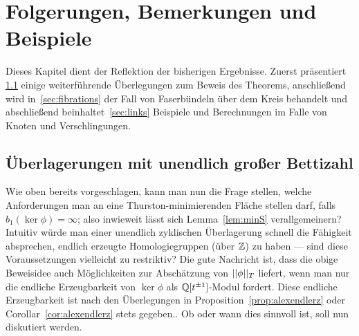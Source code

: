 
\section{Folgerungen, Bemerkungen und Beispiele}
    Dieses Kapitel dient der Reflektion der bisherigen Ergebnisse. Zuerst präsentiert \ref{verallggruppenring} einige weiterführende Überlegungen zum Beweis des Theorems, anschließend wird in~\ref{sec:fibrations} der Fall von Faserbündeln über dem Kreis behandelt und abschließend beinhaltet~\ref{sec:links} Beispiele und Berechnungen im Falle von Knoten und Verschlingungen.

    \subsection{Überlagerungen mit unendlich großer Bettizahl}
        
    \label{verallggruppenring}
    Wie oben bereits vorgeschlagen, kann man nun die Frage stellen, welche Anforderungen man an eine Thurston-minimierenden Fläche stellen darf, falls $b_1(\ker\phi)=\infty$; also inwieweit lässt sich Lemma~\ref{lem:minS} verallgemeinern? Intuitiv würde man einer unendlich zyklischen Überlagerung schnell die Fähigkeit absprechen, endlich erzeugte Homologiegruppen (über $\mathbb{Z}$) zu haben --- sind diese Voraussetzungen vielleicht zu restriktiv? Die gute Nachricht ist, dass die obige Beweisidee auch Möglichkeiten zur Abschätzung von $||\phi||_T$ liefert, wenn man nur die endliche Erzeugbarkeit von $\ker\phi$ als $\mathbb{Q}[t^{\pm 1}]$-Modul fordert. Diese endliche Erzeugbarkeit ist nach den Überlegungen in Proposition~\ref{prop:alexendlerz} oder Corollar~\ref{cor:alexendlerz} stets gegeben.. Ob oder wann dies sinnvoll ist, soll nun diskutiert werden.

